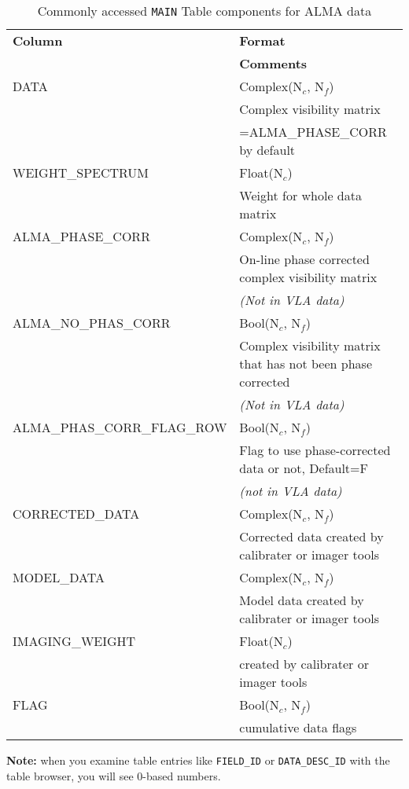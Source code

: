 \vspace{5mm}
\begin{table}[h!]
\caption[Commonly accessed {\tt MAIN} Table components for ALMA data]
        {\label{tabmain}Commonly accessed {\tt MAIN} Table components for ALMA data}
\begin{center}
\begin{tabular}{|ll|} \hline
  {\bf Column}      &  {\bf Format}        \\         
                    &  {\bf Comments}      \\        
  DATA              &  Complex(N$_c$, N$_f$)  \\       
                    &  Complex visibility matrix  \\
                    &  =ALMA\_PHASE\_CORR by default  \\
  WEIGHT\_SPECTRUM   &  Float(N$_c$)    \\            
                    &  Weight for whole data matrix \\     
  ALMA\_PHASE\_CORR   &  Complex(N$_c$, N$_f$) \\        
                    &  On-line phase corrected complex visibility matrix  \\
                    &  {\it (Not in VLA data)}  \\
  ALMA\_NO\_PHAS\_CORR  &  Bool(N$_c$, N$_f$)    \\     
                     & Complex visibility matrix that has not been phase corrected  \\
                     & {\it (Not in VLA data)}  \\
  ALMA\_PHAS\_CORR\_FLAG\_ROW  &  Bool(N$_c$, N$_f$)  \\
                           &  Flag to use phase-corrected data or not, Default=F  \\
                           &  {\it (not in VLA data)} \\    
  CORRECTED\_DATA   &  Complex(N$_c$, N$_f$)  \\     
                   &  Corrected data created by calibrater or imager tools \\ 
  MODEL\_DATA       &  Complex(N$_c$, N$_f$)      \\ 
                   &  Model data created by calibrater or imager tools  \\
  IMAGING\_WEIGHT   &  Float(N$_c$)  \\
                   &  created by calibrater or imager tools  \\
  FLAG             &  Bool(N$_c$, N$_f$) \\
                   &  cumulative data flags    \\
\hline
\end{tabular}
\end{center}
\end{table}
{\bf Note:} when you examine table entries like {\tt FIELD\_ID} or 
{\tt DATA\_DESC\_ID} with the table browser, you will see 0-based numbers.

